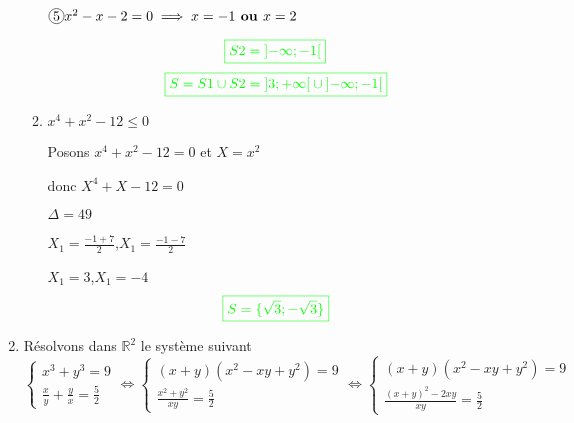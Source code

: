 \documentclass[12pt,a4paper]{article}
\begin{document}
\begin{enumerate}
\begin{enumerate}
\( \encercle{5} x^2 - x - 2 = 0 \implies x=-1 \textbf{ ou } x= 2\)
\begin{flushleft}
\end{flushleft}
\[
\textcolor{green}{\boxed{S2 = \left]-\infty ; -1\right[  }} 
\]
\[
\textcolor{green}{\boxed{S=S1 \cup S2 = \left]3 ; +\infty\right[ \cup \left]-\infty ; -1\right[  }} 
\]
\item $x^4 + x^2 - 12 \leq 0$

Posons $x^4 + x^2 - 12 = 0$ et  $X=x^2$

donc $X^4 + X - 12 = 0$

$\Delta = 49$

$X_{1}=\frac{-1+7}{2}$,$X_{1}=\frac{-1-7}{2}$

$X_{1}=3$,$X_{1}=-4 	$
\[
\textcolor{green}{\boxed{S = \{ \sqrt{3} ; -\sqrt{3} \}   }} 
\]
\end{enumerate}
    \item Résolvons dans $\mathbb{R}^2$ le système suivant
    \[
    \begin{cases}
        x^3 + y^3 = 9 \\
        \frac{x}{y} + \frac{y}{x} = \frac{5}{2}
    \end{cases} \iff
        \begin{cases}
        (x+y)(x^{2}-xy+y^{2}) = 9 \\
        \frac{x^{2}+y^{2}}{xy} = \frac{5}{2}
    \end{cases}\iff
            \begin{cases}
        (x+y)(x^{2}-xy+y^{2}) = 9 \\
        \frac{(x+y)^{2}-2xy}{xy} = \frac{5}{2}
    \end{cases}
    \]
    

\end{enumerate}
\end{document}
